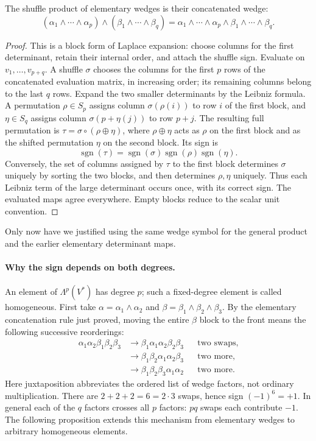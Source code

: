 \begin{proposition}
\label{prop:wedge-concatenation}
The shuffle product of elementary wedges is their concatenated wedge:
\[
(\alpha_1\wedge\cdots\wedge\alpha_p)
\wedge(\beta_1\wedge\cdots\wedge\beta_q)
=\alpha_1\wedge\cdots\wedge\alpha_p\wedge
\beta_1\wedge\cdots\wedge\beta_q.
\]
\end{proposition}
\begin{proof}
This is a block form of Laplace expansion: choose columns for the first
determinant, retain their internal order, and attach the shuffle sign.
Evaluate on $v_1,\ldots,v_{p+q}$. A shuffle $\sigma$ chooses the columns
for the first $p$ rows of the concatenated evaluation matrix, in increasing
order; its remaining columns belong to the last $q$ rows. Expand the two
smaller determinants by the Leibniz formula. A permutation $\rho\in S_p$
assigns column $\sigma(\rho(i))$ to row $i$ of the first block, and
$\eta\in S_q$ assigns column $\sigma(p+\eta(j))$ to row $p+j$.
The resulting full permutation is $\tau=\sigma\circ(\rho\oplus\eta)$,
where $\rho\oplus\eta$ acts as $\rho$ on the first block and as the
shifted permutation $\eta$ on the second block. Its sign is
\[
\operatorname{sgn}(\tau)=\operatorname{sgn}(\sigma)
\operatorname{sgn}(\rho)\operatorname{sgn}(\eta).
\]
Conversely, the set of columns assigned by $\tau$ to the first block
determines $\sigma$ uniquely by sorting the two blocks, and then determines
$\rho,\eta$ uniquely. Thus each Leibniz term of the large determinant
occurs once, with its correct sign. The evaluated maps agree everywhere.
Empty blocks reduce to the scalar unit convention.
\end{proof}
Only now have we justified using the same wedge symbol for the general
product and the earlier elementary determinant maps.

\paragraph{Why the sign depends on both degrees.}
An element of $\Lambda^p(V^*)$ has degree $p$; such a fixed-degree
element is called homogeneous. First take
$\alpha=\alpha_1\wedge\alpha_2$ and
$\beta=\beta_1\wedge\beta_2\wedge\beta_3$.
By the elementary concatenation rule just proved, moving the entire
$\beta$ block to the front means the following successive reorderings:
\[
\begin{aligned}
\alpha_1\alpha_2\beta_1\beta_2\beta_3
&\longrightarrow\beta_1\alpha_1\alpha_2\beta_2\beta_3
&&\text{two swaps},\\
&\longrightarrow\beta_1\beta_2\alpha_1\alpha_2\beta_3
&&\text{two more},\\
&\longrightarrow\beta_1\beta_2\beta_3\alpha_1\alpha_2
&&\text{two more}.
\end{aligned}
\]
Here juxtaposition abbreviates the ordered list of wedge factors, not
ordinary multiplication. There are $2+2+2=6=2\cdot3$ swaps, hence sign
$(-1)^6=+1$. In general each of the $q$ factors crosses all $p$ factors:
$pq$ swaps each contribute $-1$. The following proposition extends
this mechanism from elementary wedges to arbitrary homogeneous elements.

